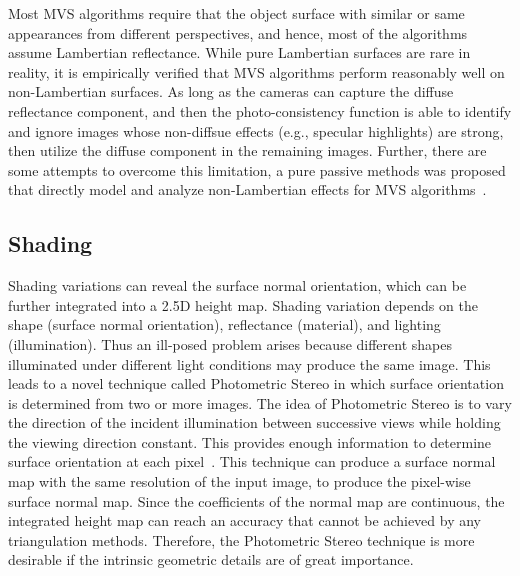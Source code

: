 Most MVS algorithms require that the object surface with similar or same appearances from different perspectives, and hence, most of the algorithms assume Lambertian reflectance. While pure Lambertian surfaces are rare in reality, it is empirically verified that MVS algorithms perform reasonably well on non-Lambertian surfaces. As long as the cameras can capture the diffuse reflectance component, and then the photo-consistency function is able to identify and ignore images whose non-diffsue effects (e.g., specular highlights) are strong, then utilize the diffuse component in the remaining images. Further, there are some attempts to overcome this limitation, a pure passive methods was proposed that directly model and analyze non-Lambertian effects for MVS algorithms~\cite{jin2003multi,jin2005multi}.

\subsection{Shading}
Shading variations can reveal the surface normal orientation, which can be further integrated into a 2.5D height map. Shading variation depends on the shape (surface normal orientation), reflectance (material), and lighting (illumination). Thus an ill-posed problem arises because different shapes illuminated under different light conditions may produce the same image. This leads to a novel technique called Photometric Stereo in which surface orientation is determined from two or more images. The idea of Photometric Stereo is to vary the direction of the incident illumination between successive views while holding the viewing direction constant. This provides enough information to determine surface orientation at each pixel~\cite{woodham1979photometric}. This technique can produce a surface normal map with the same resolution of the input image, \ie to produce the pixel-wise surface normal map. Since the coefficients of the normal map are continuous, the integrated height map can reach an accuracy that cannot be achieved by any triangulation methods. Therefore, the Photometric Stereo technique is more desirable if the intrinsic geometric details are of great importance.

